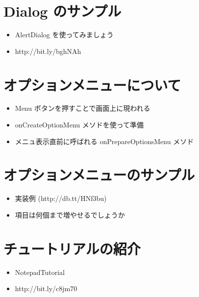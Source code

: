 \documentclass[slide,papersize]{jsarticle}
\begin{document}
\section*{Dialog のサンプル}
\bigskip
\begin{itemize}
\item AlertDialog を使ってみましょう
\bigskip
\item http://bit.ly/bghNAh
\end{itemize}

\section*{オプションメニューについて}
\bigskip
\begin{itemize}
\item Menu ボタンを押すことで画面上に現われる
\bigskip
\item onCreateOptionMenu メソドを使って準備
\bigskip
\item メニュ表示直前に呼ばれる onPrepareOptionsMenu メソド
\end{itemize}

\section*{オプションメニューのサンプル}
\bigskip
\begin{itemize}
\item 実装例 (http://db.tt/HNf3bu)
\bigskip
\item 項目は何個まで増やせるでしょうか
\end{itemize}

\section*{チュートリアルの紹介}
\bigskip
\begin{itemize}
\item NotepadTutorial
\bigskip
\item http://bit.ly/c8jm70
\end{itemize}
\end{document}
